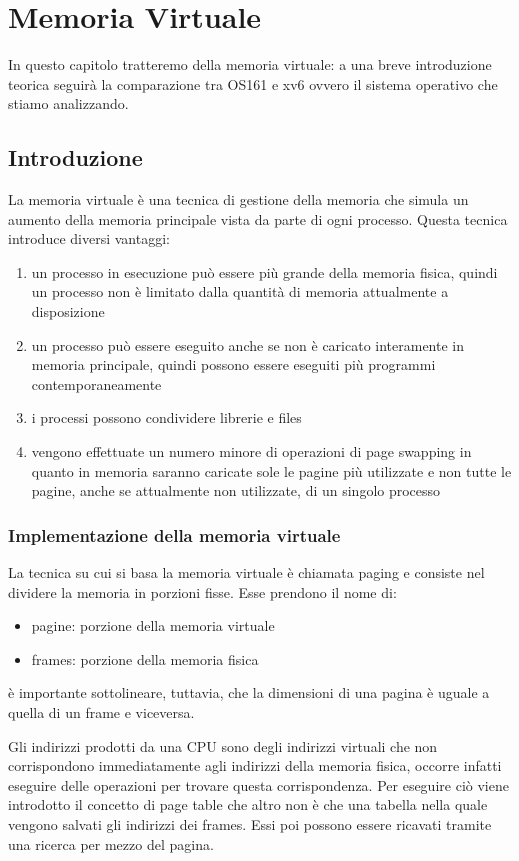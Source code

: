 \section{Memoria Virtuale}
In questo capitolo tratteremo della memoria virtuale: a una breve introduzione teorica seguirà la comparazione tra OS161 e xv6 ovvero il sistema operativo che stiamo analizzando.
\subsection{Introduzione}
La memoria virtuale è una tecnica di gestione della memoria che simula un aumento della memoria principale vista da parte di ogni processo. Questa tecnica introduce diversi vantaggi:
\begin{enumerate}
    \item un processo in esecuzione può essere più grande della memoria fisica, quindi un processo non è limitato dalla quantità di memoria attualmente a disposizione
    \item un processo può essere eseguito anche se non è caricato interamente in memoria principale, quindi possono essere eseguiti più programmi contemporaneamente
    \item i processi possono condividere librerie e files
    \item vengono effettuate un numero minore di operazioni di page swapping in quanto in memoria saranno caricate sole le pagine più utilizzate e non tutte le pagine, anche se attualmente non utilizzate, di un singolo processo
\end{enumerate}
\subsubsection{Implementazione della memoria virtuale}
La tecnica su cui si basa la memoria virtuale è chiamata paging e consiste nel dividere la memoria in porzioni fisse. Esse prendono il nome di:
\begin{itemize}
    \item pagine: porzione della memoria virtuale
    \item frames: porzione della memoria fisica
\end{itemize}
è importante sottolineare, tuttavia, che la dimensioni di una pagina è uguale a quella di un frame e viceversa.

Gli indirizzi prodotti da una CPU sono degli indirizzi virtuali che non corrispondono immediatamente agli indirizzi della memoria fisica, occorre infatti eseguire delle operazioni per trovare questa corrispondenza. Per eseguire ciò viene introdotto il concetto di page table che altro non è che una tabella nella quale vengono salvati gli indirizzi dei frames. Essi poi possono essere ricavati tramite una ricerca per mezzo del pagina.

